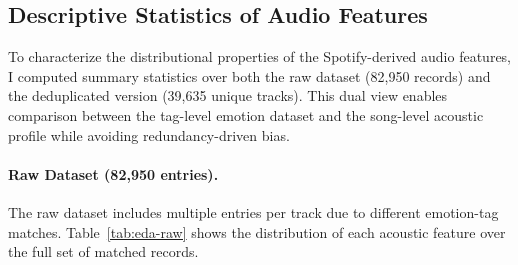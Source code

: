 \documentclass{article}
\begin{document}
\begin{table}[H]
\centering
{}
\caption{Sample records from the final dataset with audio features and emotion labels.}
\label{tab:final-sample}
\end{table}


\subsection{Descriptive Statistics of Audio Features}

To characterize the distributional properties of the Spotify-derived audio features, I computed summary statistics over both the raw dataset (82,950 records) and the deduplicated version (39,635 unique tracks). This dual view enables comparison between the tag-level emotion dataset and the song-level acoustic profile while avoiding redundancy-driven bias.

\paragraph{Raw Dataset (82,950 entries).}
The raw dataset includes multiple entries per track due to different emotion-tag matches. Table~\ref{tab:eda-raw} shows the distribution of each acoustic feature over the full set of matched records.
\end{document}
